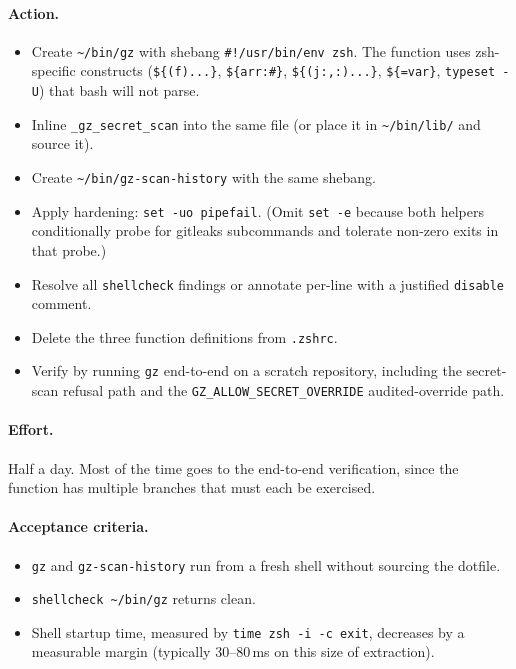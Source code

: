 \documentclass[11pt,letterpaper]{scrartcl}
\begin{document}
\paragraph{Action.}
\begin{itemize}
  \item Create \texttt{\textasciitilde/bin/gz} with shebang
        \texttt{\#!/usr/bin/env zsh}. The function uses
        zsh-specific constructs (\texttt{\$\{(f)...\}},
        \texttt{\$\{arr:\#\}}, \texttt{\$\{(j:,:)...\}},
        \texttt{\$\{=var\}}, \texttt{typeset -U}) that bash will
        not parse.
  \item Inline \texttt{\_gz\_secret\_scan} into the same file (or
        place it in \texttt{\textasciitilde/bin/lib/} and source
        it).
  \item Create \texttt{\textasciitilde/bin/gz-scan-history} with
        the same shebang.
  \item Apply hardening: \texttt{set -uo pipefail}. (Omit
        \texttt{set -e} because both helpers conditionally probe
        for gitleaks subcommands and tolerate non-zero exits in
        that probe.)
  \item Resolve all \texttt{shellcheck} findings or annotate
        per-line with a justified \texttt{disable} comment.
  \item Delete the three function definitions from \texttt{.zshrc}.
  \item Verify by running \texttt{gz} end-to-end on a scratch
        repository, including the secret-scan refusal path and the
        \texttt{GZ\_ALLOW\_SECRET\_OVERRIDE} audited-override path.
\end{itemize}

\paragraph{Effort.} Half a day. Most of the time goes to the
end-to-end verification, since the function has multiple branches
that must each be exercised.

\paragraph{Acceptance criteria.}
\begin{itemize}
  \item \texttt{gz} and \texttt{gz-scan-history} run from a fresh
        shell without sourcing the dotfile.
  \item \texttt{shellcheck \textasciitilde/bin/gz} returns clean.
  \item Shell startup time, measured by
        \texttt{time zsh -i -c exit}, decreases by a measurable
        margin (typically 30--80\,ms on this size of extraction).
\end{itemize}
\end{document}
